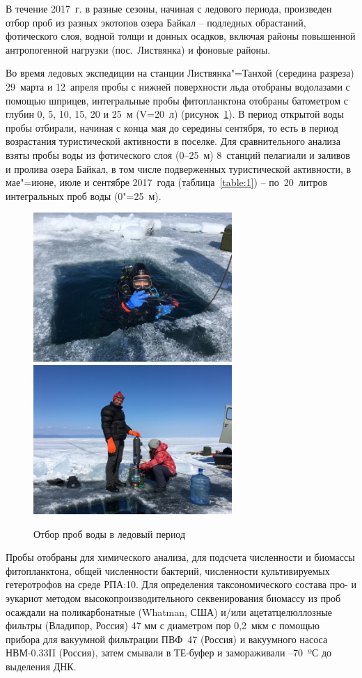 \documentclass[a4paper,12pt,openany,final]{extreport}
\newcommand\theyear{2017}
\def\oldcaption{} \let\oldcaption=\caption
\def\caption{\stepcounter{captionsnum}\oldcaption}
\begin{document}
В течение \theyear{}~г. в разные сезоны, начиная с ледового периода, произведен отбор проб из разных экотопов озера Байкал -- подледных обрастаний, фотического слоя, водной толщи и донных осадков, включая районы повышенной антропогенной нагрузки (пос.~Листвянка) и фоновые районы.

Во время ледовых экспедиции на станции Листвянка"=Танхой (середина разреза) 29~марта и 12~апреля пробы с нижней поверхности льда отобраны водолазами с помощью шприцев, интегральные пробы фитопланктона отобраны батометром с глубин 0, 5, 10, 15, 20 и 25~м (V=20~л) (рисунок~\ref{fig:photo1}). В период открытой воды пробы отбирали, начиная с конца мая до середины сентября, то есть в период возрастания туристической активности в поселке. Для сравнительного анализа взяты пробы воды из фотического слоя (0--25~м) 8~станций пелагиали и заливов и пролива озера Байкал, в том числе подверженных туристической активности, в мае"=июне, июле и сентябре 2017~года (таблица~\ref{table:1}) -- по~20~литров интегральных проб воды (0"=25~м).

\begin{figure}\centering
  \includegraphics[height=2.23in]{media/image1.jpeg}\quad
  \includegraphics[height=2.23in]{media/image2.jpeg}
  \caption{Отбор  проб  воды  в  ледовый  период }\label{fig:photo1}
\end{figure}

Пробы отобраны для химического анализа, для подсчета численности и биомассы фитопланктона, общей численности бактерий, численности культивируемых гетеротрофов на среде РПА:10. Для определения таксономического состава про- и эукариот методом высокопроизводительного секвенирования биомассу из проб осаждали на поликарбонатные (Whatman, США) и/или ацетатцелюллозные фильтры (Владипор, Россия) 47 мм с диаметром пор 0,2~мкм с помощью прибора для вакуумной фильтрации ПВФ~47 (Россия) и вакуумного насоса НВМ-0.33II (Россия), затем смывали в ТЕ-буфер и замораживали –70~ºС до выделения ДНК.
\end{document}
